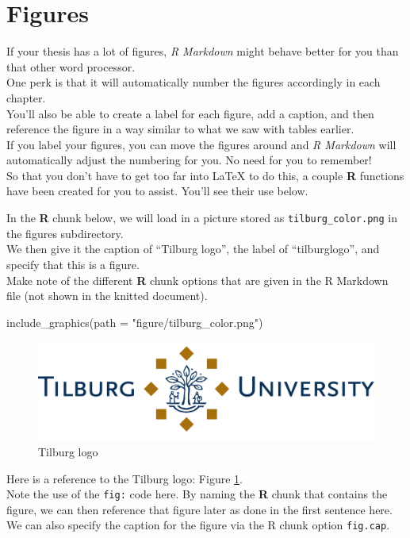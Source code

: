 \documentclass[12pt,oneside]{tisemthesis}
\newenvironment{Shaded}{\begin{snugshade}}{\end{snugshade}}
\newcommand{\AttributeTok}[1]{\textcolor[rgb]{0.77,0.63,0.00}{#1}}
\newcommand{\FunctionTok}[1]{\textcolor[rgb]{0.00,0.00,0.00}{#1}}
\newcommand{\NormalTok}[1]{#1}
\newcommand{\StringTok}[1]{\textcolor[rgb]{0.31,0.60,0.02}{#1}}
\begin{document}
\hypertarget{figures}{%
\section{Figures}\label{figures}}

If your thesis has a lot of figures, \emph{R Markdown} might behave better for you than that other word processor.\\
One perk is that it will automatically number the figures accordingly in each chapter.\\
You'll also be able to create a label for each figure, add a caption, and then reference the figure in a way similar to what we saw with tables earlier.\\
If you label your figures, you can move the figures around and \emph{R Markdown} will automatically adjust the numbering for you. No need for you to remember!\\
So that you don't have to get too far into LaTeX to do this, a couple \textbf{R} functions have been created for you to assist. You'll see their use below.

In the \textbf{R} chunk below, we will load in a picture stored as \texttt{tilburg\_color.png} in the figures subdirectory.\\
We then give it the caption of ``Tilburg logo'', the label of ``tilburglogo'', and specify that this is a figure.\\
Make note of the different \textbf{R} chunk options that are given in the R Markdown file (not shown in the knitted document).
\begin{Shaded}
\begin{Highlighting}[]
\FunctionTok{include\_graphics}\NormalTok{(}\AttributeTok{path =} \StringTok{"figure/tilburg\_color.png"}\NormalTok{)}
\end{Highlighting}
\end{Shaded}
\begin{figure}

{\centering \includegraphics[width=0.45\linewidth]{figure/tilburg_color} 

}

\caption{Tilburg logo}\label{fig:tilburglogo}
\end{figure}
Here is a reference to the Tilburg logo: Figure \ref{fig:tilburglogo}.\\
Note the use of the \texttt{fig:} code here. By naming the \textbf{R} chunk that contains the figure, we can then reference that figure later as done in the first sentence here.\\
We can also specify the caption for the figure via the R chunk option \texttt{fig.cap}.
\end{document}
